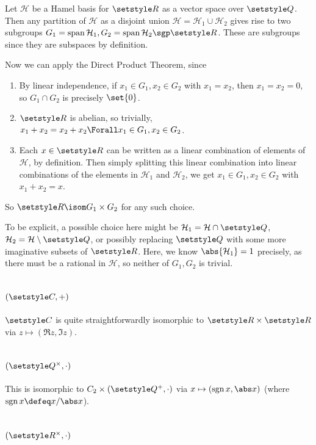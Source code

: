 \documentclass[fleqn,a4paper,11pt]{article}
\begin{document}
Let \(\mathcal H\) be a Hamel basis for \(\Reals\) as a vector space over
\(\Rationals\). Then any partition of \(\mathcal H\) as a disjoint union
\(\mathcal H = \mathcal H_1 \cup \mathcal H_2\) gives rise to two subgroups
\(G_1 = \vspan \mathcal H_1, G_2 = \vspan \mathcal H_2 \sgp \Reals\). These are
subgroups since they are subspaces by definition.

Now we can apply the Direct Product Theorem, since
\begin{enumerate}[label=(\roman*)]
 \item
  By linear independence, if \(x_1 \in G_1, x_2 \in G_2\) with \(x_1 = x_2\),
  then \(x_1 = x_2 = 0\), so \(G_1 \cap G_2\) is precisely \(\set{0}\).
 \item
  \(\Reals\) is abelian, so trivially,
  \(x_1 + x_2 = x_2 + x_2 \Forall x_1 \in G_1, x_2 \in G_2\).
 \item
  Each \(x \in \Reals\) can be written as a linear combination of elements of
  \(\mathcal H\), by definition. Then simply splitting this linear combination
  into linear combinations of the elements in \(\mathcal H_1\) and
  \(\mathcal H_2\), we get \(x_1 \in G_1, x_2 \in G_2\) with \(x_1 + x_2 = x\).
\end{enumerate}
So \(\Reals \isom G_1 \times G_2\) for any such choice.

To be explicit, a possible choice here might be
\(\mathcal H_1 = \mathcal H \cap \Rationals\),
\(\mathcal H_2 = \mathcal H \setminus \Rationals\), or possibly replacing
\(\Rationals\) with some more imaginative subsets of \(\Reals\). Here, we know
\(\abs{\mathcal H_1} = 1\) precisely, as there must be a rational in
\(\mathcal H\), so neither of \(G_1, G_2\) is trivial.

\section{\((\Complex, +)\)}

\(\Complex\) is quite straightforwardly isomorphic to \(\Reals \times \Reals\)
via \(z \mapsto (\Re z, \Im z)\).

\section{\((\Rationals^\times, \cdot)\)}

This is isomorphic to \(C_2 \times (\Rationals^+, \cdot)\) via
\(x \mapsto (\sgn x, \abs x)\) (where \(\sgn x \defeq x/\abs x\)).

\section{\((\Reals^\times, \cdot)\)}
\end{document}
